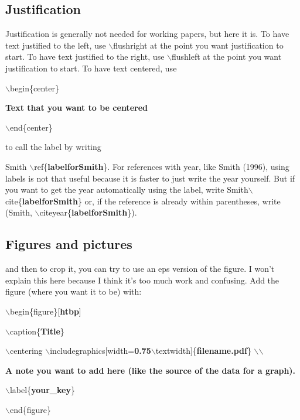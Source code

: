 \documentclass[12pt]{article}%
\begin{document}
\subsection{Justification} 

Justification is generally not needed for working papers, but here it is. 
To have text justified to the left, use $\backslash$flushright at the point you want justification to start.
To have text justified to the right, use $\backslash$flushleft at the point you want justification to start.
To have text centered, use 

$\backslash$begin\{center\} 

\quad \textbf{Text that you want to be centered}

$\backslash$end\{center\}


to call the label by writing

	Smith $\backslash$ref\{\textbf{labelforSmith}\}.
For references with year, like Smith (1996), using labels is not that useful because it is faster to just write the year yourself. But if you want to get the year automatically using the label, write 
	Smith$\backslash$cite\{\textbf{labelforSmith}\}
or, if the reference is already within parentheses, write
	(Smith, $\backslash$citeyear\{\textbf{labelforSmith}\}).

\subsection{Figures and pictures}

and then to crop it, you can try to use an eps version of the figure. I won't explain this here because I think it's too much work and confusing. 
Add the figure (where you want it to be) with: 

$\backslash$begin\{figure\}[\textbf{htbp}]

	\quad $\backslash$caption\{\textbf{Title}\}

\quad $\backslash$centering  $\backslash$includegraphics[width=\textbf{0.75}$\backslash$textwidth]\{\textbf{filename.pdf}\} $\backslash$$\backslash$ 

\quad \textbf{A note you want to add here (like the source of the data for a graph).}

\quad $\backslash$label\{\textbf{your\_key}\} 

$\backslash$end\{figure\}
\end{document}
